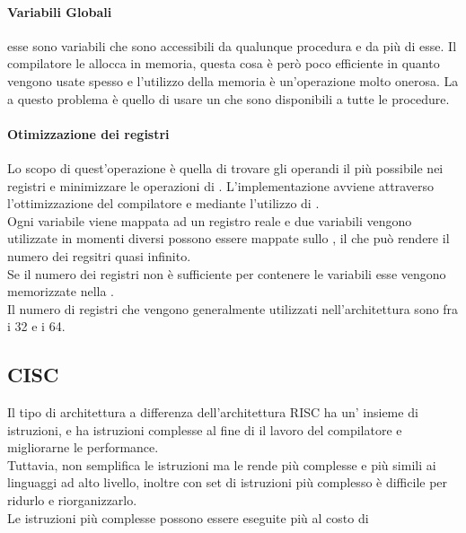 \documentclass[arch.tex]{subfiles}
\begin{document}
\paragraph{Variabili Globali}%
\label{par:variabili_globali}

esse sono variabili che sono accessibili da qualunque procedura e da più di esse. Il compilatore
le allocca in memoria, questa cosa è però poco efficiente in quanto vengono usate spesso 
e l'utilizzo della memoria è un'operazione molto onerosa. La  a questo problema
è quello di usare un  che sono disponibili a tutte le procedure.

\paragraph{Otimizzazione dei registri}%
\label{par:otimizzazione_dei_registri}

Lo scopo di quest'operazione è quella di trovare gli operandi il più possibile nei registri
e minimizzare le operazioni di . L'implementazione  avviene
attraverso l'ottimizzazione del compilatore e mediante l'utilizzo di .\\
Ogni variabile viene mappata ad un registro reale e  due variabili vengono utilizzate
in momenti diversi possono essere mappate sullo , il che può rendere il
numero dei regsitri quasi infinito.\\ 
Se il numero dei registri non è sufficiente per contenere  le variabili esse
vengono memorizzate nella .\\
Il numero di registri che vengono generalmente utilizzati nell'architettura  sono
fra i 32 e i 64.

\subsection{CISC}%
\label{sub:cisc}
Il tipo di architettura   a differenza 
dell'architettura RISC ha un' insieme di istruzioni, e ha istruzioni 
 complesse al fine di  il lavoro del compilatore e migliorarne le
performance.\\
Tuttavia, non semplifica le istruzioni ma le rende più complesse e più simili ai linguaggi ad
alto livello, inoltre con set di istruzioni più complesso è difficile  per ridurlo e riorganizzarlo.\\
Le istruzioni più complesse possono essere eseguite più   al costo di
\end{document}
